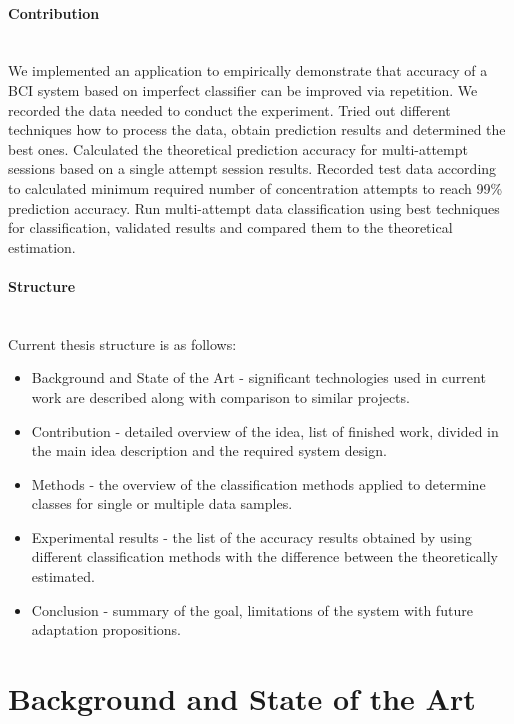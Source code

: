 \documentclass[12pt]{article}
\theoremstyle{definition}
\begin{document}
\paragraph{Contribution}~\\

We implemented an application to empirically demonstrate that accuracy of a BCI system based on imperfect classifier can be improved via repetition. We recorded the data needed to conduct the experiment. Tried out different techniques how to process the data, obtain prediction results and determined the best ones. Calculated the theoretical prediction accuracy for multi-attempt sessions based on a single attempt session results. Recorded test data according to calculated minimum required number of concentration attempts to reach 99\% prediction accuracy. Run multi-attempt data classification using best techniques for classification, validated results and compared them to the theoretical estimation.
\paragraph{Structure}~\\
Current thesis structure is as follows:

\begin{itemize}
\item Background and State of the Art - significant technologies used in current work are described along with comparison to similar projects.
\item Contribution - detailed overview of the idea, list of finished work, divided in the  main idea description and the required system design.
\item Methods - the overview of the classification methods applied to determine classes for single or multiple data samples.
\item Experimental results - the list of the accuracy results obtained by using different classification methods with the difference between the theoretically estimated.
\item Conclusion - summary of the goal, limitations of the system with future adaptation propositions. 
\end{itemize}

\newpage
\section{Background and State of the Art} 
\end{document}
